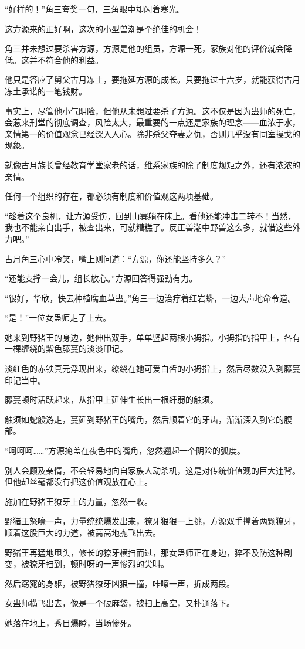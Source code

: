 \begin{this_body}
“好样的！”角三夸奖一句，三角眼中却闪着寒光。

这方源来的正好啊，这次的小型兽潮是个绝佳的机会！

角三并未想过要杀害方源，方源是他的组员，方源一死，家族对他的评价就会降低。这并不符合他的利益。

他只是答应了舅父古月冻土，要拖延方源的成长。只要拖过十六岁，就能获得古月冻土承诺的一笔钱财。

事实上，尽管他小气阴险，但他从未想过要杀了方源。这不仅是因为蛊师的死亡，会惹来刑堂的彻底调查，风险太大，最重要的一点还是家族的理念——血浓于水，亲情第一的价值观念已经深入人心。除非杀父夺妻之仇，否则几乎没有同室操戈的现象。

就像古月族长曾经教育学堂家老的话，维系家族的除了制度规矩之外，还有浓浓的亲情。

任何一个组织的存在，都必须有制度和价值观这两项基础。

“趁着这个良机，让方源受伤，回到山寨躺在床上。看他还能冲击二转不！当然，我也不能亲自出手，被查出来，可就糟糕了。反正兽潮中野兽这么多，就借这些外力吧。”

古月角三心中冷笑，嘴上则问道：“方源，你还能坚持多久？”

“还能支撑一会儿，组长放心。”方源回答得强劲有力。

“很好，华欣，快去种植腐血草蛊。”角三一边治疗着红岩蟒，一边大声地命令道。

“是！”一位女蛊师走了上去。

她来到野猪王的身边，她伸出双手，单单竖起两根小拇指。小拇指的指甲上，各有一棵缠绕的紫色藤蔓的淡淡印记。

淡红色的赤铁真元浮现出来，缭绕在她可爱白皙的小拇指上，然后尽数没入到藤蔓印记当中。

藤蔓顿时活跃起来，从指甲上延伸生长出一根纤弱的触须。

触须如蛇般游走，蔓延到野猪王的嘴角，然后顺着它的牙齿，渐渐深入到它的腹部。

“呵呵呵……”方源掩盖在夜色中的嘴角，忽然翘起一个阴险的弧度。

别人会顾及亲情，不会轻易地向自家族人动杀机，这是对传统价值观的巨大违背。但他却丝毫都没有把这价值观放在心上。

施加在野猪王獠牙上的力量，忽然一收。

野猪王怒嚎一声，力量统统爆发出来，獠牙狠狠一上挑，方源双手撑着两颗獠牙，顺着这股巨大的力道，被高高地抛飞出去。

野猪王再猛地甩头，修长的獠牙横扫而过，那女蛊师正在身边，猝不及防这种剧变，被獠牙扫到，顿时呀的一声惨烈的尖叫。

然后窈窕的身躯，被野猪獠牙凶狠一撞，咔嚓一声，折成两段。

女蛊师横飞出去，像是一个破麻袋，被扫上高空，又扑通落下。

她落在地上，秀目爆瞪，当场惨死。

------------

\end{this_body}

